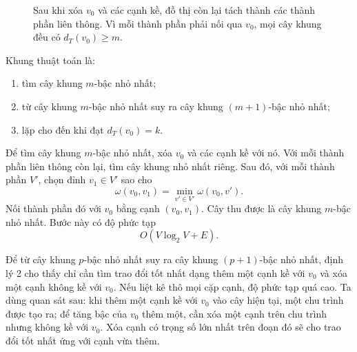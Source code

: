\documentclass[11pt]{article}
\begin{document}
\begin{figure}[ht]
\centering
{}
\caption{Sau khi xóa $v_0$ và các cạnh kề, đồ thị còn lại tách thành các
thành phần liên thông. Vì mỗi thành phần phải nối qua $v_0$, mọi cây khung
đều có $d_T(v_0)\ge m$.}
\end{figure}

Khung thuật toán là:
\begin{enumerate}
  \item tìm cây khung $m$-bậc nhỏ nhất;
  \item từ cây khung $m$-bậc nhỏ nhất suy ra cây khung $(m+1)$-bậc nhỏ nhất;
  \item lặp cho đến khi đạt $d_T(v_0)=k$.
\end{enumerate}

Để tìm cây khung $m$-bậc nhỏ nhất, xóa $v_0$ và các cạnh kề với nó. Với mỗi
thành phần liên thông còn lại, tìm cây khung nhỏ nhất riêng. Sau đó, với mỗi
thành phần $V'$, chọn đỉnh $v_1\in V'$ sao cho
\[
  \omega(v_0,v_1)=\min_{v'\in V'} \omega(v_0,v').
\]
Nối thành phần đó với $v_0$ bằng cạnh $(v_0,v_1)$. Cây thu được là cây khung
$m$-bậc nhỏ nhất. Bước này có độ phức tạp
\[
  O(V\log_2 V+E).
\]

Để từ cây khung $p$-bậc nhỏ nhất suy ra cây khung $(p+1)$-bậc nhỏ nhất, định
lý 2 cho thấy chỉ cần tìm trao đổi tốt nhất dạng thêm một cạnh kề với $v_0$ và
xóa một cạnh không kề với $v_0$. Nếu liệt kê thô mọi cặp cạnh, độ phức tạp
quá cao. Ta dùng quan sát sau: khi thêm một cạnh kề với $v_0$ vào cây hiện
tại, một chu trình được tạo ra; để tăng bậc của $v_0$ thêm một, cần xóa một
cạnh trên chu trình nhưng không kề với $v_0$. Xóa cạnh có trọng số lớn nhất
trên đoạn đó sẽ cho trao đổi tốt nhất ứng với cạnh vừa thêm.
\end{document}
